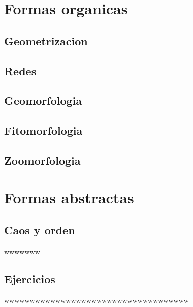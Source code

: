 \documentclass[16pt,]{krantz}
\theoremstyle{definition}
\theoremstyle{definition}
\theoremstyle{definition}
\theoremstyle{definition}
\theoremstyle{remark}
\begin{document}
\hypertarget{formas-organicas}{%
\chapter{Formas organicas}\label{formas-organicas}}

\hypertarget{geometrizacion}{%
\section{Geometrizacion}\label{geometrizacion}}

\hypertarget{redes}{%
\section{Redes}\label{redes}}

\hypertarget{geomorfologia}{%
\section{Geomorfologia}\label{geomorfologia}}

\hypertarget{fitomorfologia}{%
\section{Fitomorfologia}\label{fitomorfologia}}

\hypertarget{zoomorfologia}{%
\section{Zoomorfologia}\label{zoomorfologia}}

\hypertarget{formas-abstractas}{%
\chapter{Formas abstractas}\label{formas-abstractas}}

\hypertarget{caos-y-orden}{%
\section{Caos y orden}\label{caos-y-orden}}

\citep{bookdown2016}wwwwwww \citep{vincze2014college}

\hypertarget{ejercicios}{%
\section{Ejercicios}\label{ejercicios}}

wwwwwwwwwwwwwwwwwwwwwwwwwwwwwwwwwwww
\end{document}
